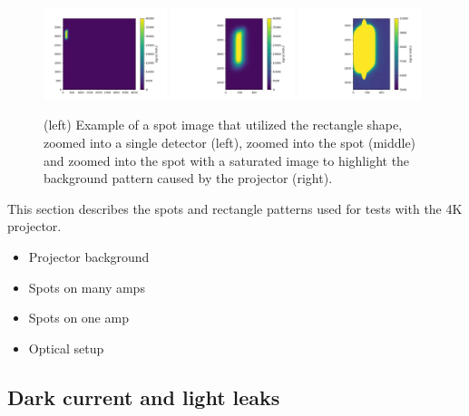 \begin{figure}[htbp]
\centering
\includegraphics[width=0.32\textwidth]{figures/Rectange_Detector_Ex.png}
\includegraphics[width=0.32\textwidth]{figures/Rectange_Spot_Ex.png}
\includegraphics[width=0.32\textwidth]{figures/Rectange_Spot_Sat.png}
\caption{(left) Example of a spot image that utilized the rectangle shape, zoomed into a single detector (left), zoomed into the spot (middle) and zoomed into the spot with a saturated image to highlight the background pattern caused by the projector (right).}
\label{fig:SpotProjector_Rect}
\end{figure}

This section describes the spots and rectangle patterns used for tests with the 4K
projector.

\begin{itemize}
\tightlist
\item
  Projector background
\item
  Spots on many amps
\item
  Spots on one amp
\item
  Optical setup
\end{itemize}

\subsection{Dark current and light
leaks}\label{dark-current-and-light-leaks}


